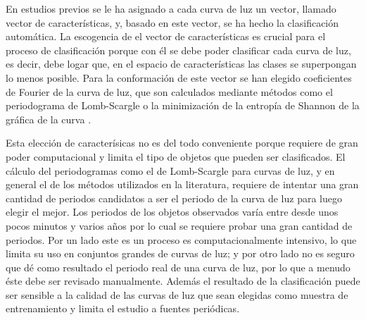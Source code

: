 \documentclass[letterpaper,12pt]{book}
\begin{document}
En estudios previos \cite{debosscher_automated_2007, sarro_automated_2009, richards_machine-learned_2011} se le ha asignado a cada curva de luz un vector, llamado vector de características, y, basado en este vector, se ha hecho la clasificación automática. La escogencia de el vector de características es crucial para el proceso de clasificación porque con él se debe poder clasificar cada curva de luz, es decir, debe logar que, en el espacio de características las clases se superpongan lo menos posible. Para la conformación de este vector se han elegido coeficientes de Fourier de la curva de luz\cite{debosscher_automated_2007, sarro_automated_2009, richards_machine-learned_2011}, que son calculados mediante métodos como el periodograma de  Lomb-Scargle \cite{scargle_studies_1982} o la minimización de la entropía de Shannon de la gráfica de la curva \cite{cincotta_astronomical_1995}. 

Esta elección de caracterísicas no es del todo conveniente porque requiere de gran poder computacional y limita el tipo de objetos que pueden ser clasificados. El cálculo del periodogramas como el de Lomb-Scargle para curvas de luz, y en general el de los métodos utilizados en la literatura, requiere de intentar una gran cantidad de periodos candidatos a ser el periodo de la curva de luz para luego elegir el mejor. Los periodos de los objetos observados varía entre desde unos pocos minutos y varios años por lo cual se requiere probar una gran cantidad de periodos. Por un lado este es un proceso es computacionalmente intensivo, lo que limita su uso en conjuntos grandes de curvas de luz; y por otro lado no es seguro que dé como resultado el periodo real de una curva de luz, por lo que a menudo éste debe ser revisado manualmente. Además el resultado de la clasificación puede ser sensible a la calidad de las curvas de luz que sean elegidas como muestra de entrenamiento \cite{debosscher_automated_2007} y limita el estudio a fuentes periódicas.  
\end{document}
